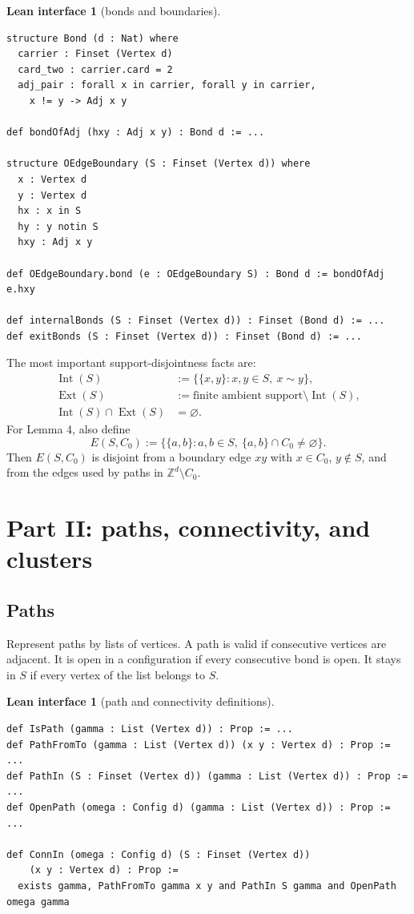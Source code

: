 \documentclass[11pt]{article}
\newcommand{\Z}{\mathbb Z}
\newcommand{\Int}{\operatorname{Int}}
\newcommand{\Ext}{\operatorname{Ext}}
\theoremstyle{definition}
\newtheorem{interface}[definition]{Lean interface}
\theoremstyle{plain}
\begin{document}
\begin{interface}[bonds and boundaries]
\begin{lstlisting}
structure Bond (d : Nat) where
  carrier : Finset (Vertex d)
  card_two : carrier.card = 2
  adj_pair : forall x in carrier, forall y in carrier,
    x != y -> Adj x y

def bondOfAdj (hxy : Adj x y) : Bond d := ...

structure OEdgeBoundary (S : Finset (Vertex d)) where
  x : Vertex d
  y : Vertex d
  hx : x in S
  hy : y notin S
  hxy : Adj x y

def OEdgeBoundary.bond (e : OEdgeBoundary S) : Bond d := bondOfAdj e.hxy

def internalBonds (S : Finset (Vertex d)) : Finset (Bond d) := ...
def exitBonds (S : Finset (Vertex d)) : Finset (Bond d) := ...
\end{lstlisting}
\end{interface}

The most important support-disjointness facts are:
\begin{align*}
  \Int(S) &:= \{\{x,y\}: x,y\in S,\ x\sim y\},\\
  \Ext(S) &:= \text{finite ambient support}\setminus \Int(S),\\
  \Int(S)\cap \Ext(S) &= \varnothing.
\end{align*}
For Lemma 4, also define
\[
  E(S,C_0) := \{\{a,b\}: a,b\in S,\ \{a,b\}\cap C_0\ne\varnothing\}.
\]
Then $E(S,C_0)$ is disjoint from a boundary edge $xy$ with $x\in C_0$, $y\notin S$, and from the edges used by paths in $\Z^d\setminus C_0$.

\section{Part II: paths, connectivity, and clusters}

\subsection{Paths}

Represent paths by lists of vertices.  A path is valid if consecutive vertices are adjacent.  It is open in a configuration if every consecutive bond is open.  It stays in $S$ if every vertex of the list belongs to $S$.

\begin{interface}[path and connectivity definitions]
\begin{lstlisting}
def IsPath (gamma : List (Vertex d)) : Prop := ...
def PathFromTo (gamma : List (Vertex d)) (x y : Vertex d) : Prop := ...
def PathIn (S : Finset (Vertex d)) (gamma : List (Vertex d)) : Prop := ...
def OpenPath (omega : Config d) (gamma : List (Vertex d)) : Prop := ...

def ConnIn (omega : Config d) (S : Finset (Vertex d))
    (x y : Vertex d) : Prop :=
  exists gamma, PathFromTo gamma x y and PathIn S gamma and OpenPath omega gamma
\end{lstlisting}
\end{interface}
\end{document}
